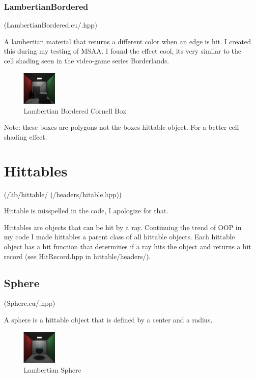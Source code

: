 \documentclass{article}
\begin{document}
        
        \subsubsection{LambertianBordered}
        (LambertianBordered.cu/.hpp)\par
        A lambertian material that returns a different color when an edge is hit. I created this during my testing of MSAA. I found the effect cool, its very similar to the cell shading seen in the video-game series Borderlands.\par
        \begin{figure}[H]
            \centering
            \includegraphics[width=0.15\textwidth]{samples/lambertianBorderedCornell.png}
            \caption{Lambertian Bordered Cornell Box}
        \end{figure}

        Note: these boxes are polygons not the boxes hittable object. For a better cell shading effect. \par


\section{Hittables}
    (/lib/hittable/ (/headers/hitable.hpp))\par
    Hittable is misspelled in the code, I apologize for that. \par
    Hittables are objects that can be hit by a ray. Continuing the trend of OOP in my code I made hittables a parent class of all hittable objects. Each hittable object has a hit function that determines if a ray hits the object and returns a hit record (see HitRecord.hpp in hittable/headers/). \par

    \subsection{Sphere}
    (Sphere.cu/.hpp)\par
    A sphere is a hittable object that is defined by a center and a radius.  \par
    \begin{figure}[H]
        \centering
        \includegraphics[width=0.15\textwidth]{samples/LambertianSphere.png}
        \caption{Lambertian Sphere}
    \end{figure}
\end{document}
